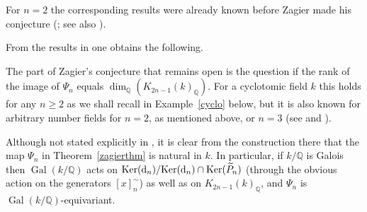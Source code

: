 \documentclass{amsart}
\begin{document}
\begin{remark}
For $ n=2 $ the corresponding results were already known before Zagier made his conjecture
(\cite{bl00,susXkof}; see also \cite[\S~2]{gon:goc}).
\end{remark}

From the results in \cite[\S~5]{dJ95} one obtains the following.


\begin{remark}
The part of Zagier's conjecture that remains open is the question if the rank of the image of
$ \Psi_n $ equals $ \dim_{\mathbb Q}({K_{2n-1}(k)_{\mathbb Q}}) $.
For a cyclotomic field $ k $ this holds for any $ n \geq 2 $ as we shall recall in Example~\ref{cyclo} below,
but it is also known for arbitrary number fields for $ n=2 $, as mentioned above, or $ n=3 $
(see \cite[\S~3]{gonXpam} and \cite[Appendix]{G3}).
\end{remark}

\begin{remark}\label{equivariance}
Although not stated explicitly in \cite{dJ95}, it is clear from the construction there that the map $ \Psi_n $
in Theorem~\ref{zagierthm}
is natural in $ k $.  In particular, if $ k/{\mathbb Q} $ is Galois then $ {\operatorname{Gal}}(k/{\mathbb Q}) $ acts on
$ {\operatorname{Ker}}({{\textup{d}}}_n) /{\operatorname{Ker}}({{\textup{d}}}_n) \cap {\operatorname{Ker}}(\widetilde P_n) $ (through the obvious action on the generators $ [x]_n^\sim $)
as well as on $ {K_{2n-1}(k)_{\mathbb Q}}$, and $ \Psi_n $ is $ {\operatorname{Gal}}(k/{\mathbb Q}) $-equivariant.
\end{remark}
\end{document}
